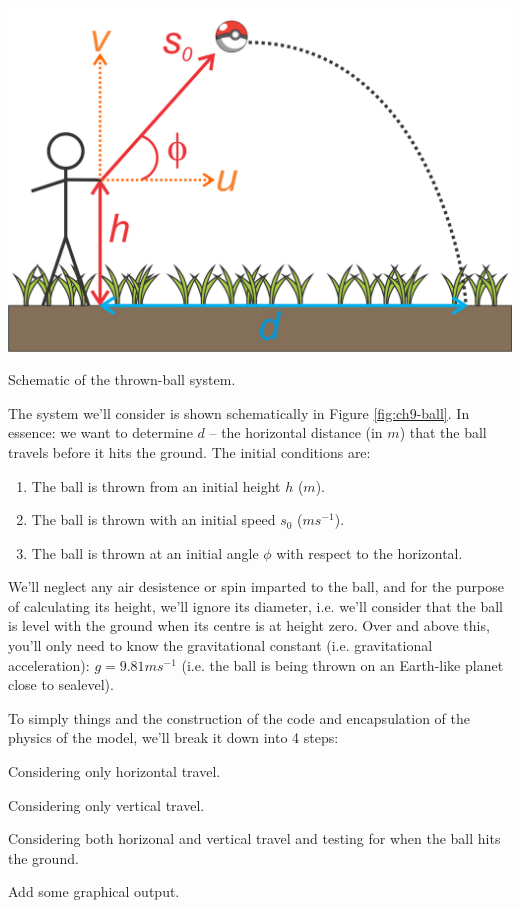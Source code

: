 \documentclass{tufte-book} %
\begin{document}
\begin{marginfigure}[0.0in]
\includegraphics[width=\linewidth]{ch9-ball.png}
\caption{Schematic of the thrown-ball system.}
\label{fig:ch9-ball}
\end{marginfigure}

The system we'll consider is shown schematically in Figure \ref{fig:ch9-ball}. In essence: we want to determine \(d\) -- the horizontal distance (in \(m\)) that the ball travels before it hits the ground. The initial conditions are:
\begin{enumerate}[noitemsep]
\setlength{\itemindent}{.2in}
\item The ball is thrown from an initial height \(h\) (\(m\)).
\item The ball is thrown with an initial speed \(s_{0}\) (\(ms^{-1}\)).
\item The ball is thrown at an initial angle \(\phi\) with respect to the horizontal.
\end{enumerate}
We'll neglect any air desistence or spin imparted to the ball, and for the purpose of calculating its height, we'll ignore its diameter, i.e. we'll consider that the ball is level with the ground when its centre is at height zero. Over and above this, you'll only need to know the gravitational constant (i.e. gravitational acceleration): \(g=9.81 ms^{-1}\) (i.e. the ball is being thrown on an Earth-like planet close to sealevel).

To simply things and the construction of the code and encapsulation of the physics of the model, we'll break it down into 4 steps:

\begin{description}[align=right]

\setlength{\itemindent}{-0.2in}

\item [Part I] Considering only horizontal travel.

\item [Part II] Considering only vertical travel.

\item [Part III] Considering both horizonal and vertical travel and testing for when the ball hits the ground.

\item [Part IV] Add some graphical output.

\end{description}
\end{document}
